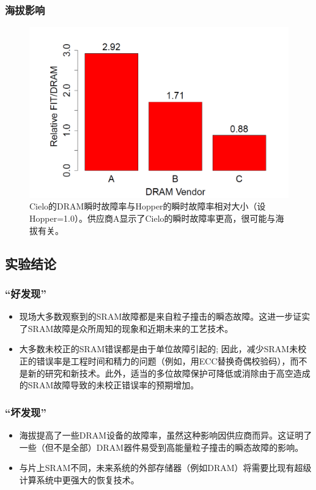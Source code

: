 \documentclass[11pt, a4paper]{article}
\begin{document}
\subsubsection{海拔影响}
\begin{figure}[H]
  \begin{center}
    \includegraphics[width=5in]{dram_vendor.png}
    \caption{Cielo的DRAM瞬时故障率与Hopper的瞬时故障率相对大小（设Hopper=1.0）。供应商A显示了Cielo的瞬时故障率更高，很可能与海拔有关。} \label{fig:dram_vendor}
  \end{center}
\end{figure}

\subsection{实验结论}

\subsubsection{“好发现”}

\begin{itemize}
\item 现场大多数观察到的SRAM故障都是来自粒子撞击的瞬态故障。这进一步证实了SRAM故障是众所周知的现象和近期未来的工艺技术。
\item 大多数未校正的SRAM错误都是由于单位故障引起的; 因此，减少SRAM未校正的错误率是工程时间和精力的问题（例如，用ECC替换奇偶校验码），而不是新的研究和新技术。此外，适当的多位故障保护可降低或消除由于高空造成的SRAM故障导致的未校正错误率的预期增加。
\end{itemize}

\subsubsection{“坏发现”}
\begin{itemize}
\item 海拔提高了一些DRAM设备的故障率，虽然这种影响因供应商而异。这证明了一些（但不是全部）DRAM器件易受到高能量粒子撞击的瞬态故障的影响。
\item 与片上SRAM不同，未来系统的外部存储器（例如DRAM）将需要比现有超级计算系统中更强大的恢复技术。
\end{itemize}
\end{document}
